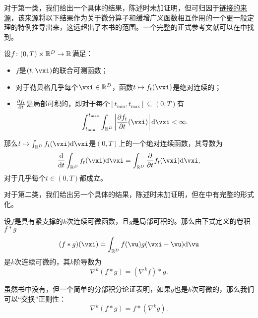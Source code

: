 \documentclass[../../book-main.tex]{subfiles}
\begin{document}
对于第一类，我们给出一个具体的结果，陈述时未加证明，但可归因于\href{https://planetmath.org/differentiationundertheintegralsign}{链接的来源}，该来源将以下结果作为关于微分算子和缓增广义函数相互作用的一个更一般定理的特例推导出来，这远超出了本书的范围。一个完整的正式参考文献可以在\cite{jones1982theory}中找到。
\begin{proposition}\label{prop:dutis}
    设\(f \colon (0, T) \times \mathbb{R}^{D} \to \mathbb{R}\)满足：
    \begin{itemize}
        \item \(f\)是\((t, \vxi)\)的联合可测函数；
        \item 对于勒贝格几乎每个\(\vxi \in \R^{D}\)，函数\(t \mapsto f_{t}(\vxi)\)是绝对连续的；
        \item \(\pdv{f_{t}}{t}\)是局部可积的，即对于每个\([t_{\min}, t_{\max}] \subseteq (0, T)\)有
        \begin{equation}
            \int_{t_{\min}}^{t_{\max}}\int_{\R^{D}}\abs*{\pdv{f_{t}}{t}(\vxi)}\odif{\vxi} < \infty.
        \end{equation}
    \end{itemize}
    那么\(t \mapsto \int_{\R^{D}}f_{t}(\vxi)\odif{\vxi}\)是\((0, T)\)上的一个绝对连续函数，其导数为
    \begin{equation}
        \odv*{\int_{\R^{D}}f_{t}(\vxi)\odif{\vxi}}{t} = \int_{\R^{D}}\pdv*{f_{t}}{t}(\vxi)\odif{\vxi},
    \end{equation}
    对于几乎每个\(t \in (0, T)\)都成立。
\end{proposition}

对于第二类，我们给出另一个具体的结果，陈述时未加证明，但在\cite{brezis2011functional}中有完整的形式化。
\begin{proposition}\label{prop:diff_convolution}
    设\(f\)是具有紧支撑的\(k\)次连续可微函数，且\(g\)是局部可积的。那么由下式定义的卷积\(f * g\)
    \begin{equation}
        (f * g)(\vxi) \doteq \int_{\R^{D}}f(\vu)g(\vxi - \vu)\odif{\vu}
    \end{equation}
    是\(k\)次连续可微的，其\(k\)阶导数为
    \begin{equation}
        \nabla^{k}(f * g) =(\nabla^{k}f) * g. 
    \end{equation}
\end{proposition}
虽然书中没有，但一个简单的分部积分论证表明，如果\(g\)也是\(k\)次可微的，那么我们可以“交换”正则性：
\begin{equation}
    \nabla^{k}(f * g) = f * (\nabla^{k} g).
\end{equation}
\end{document}
